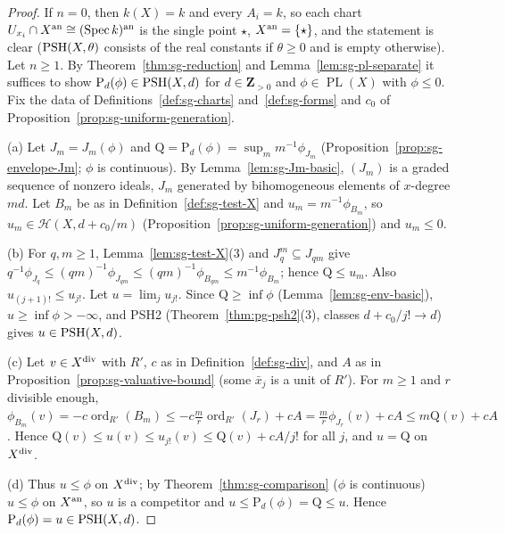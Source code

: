 \begin{proof}
If $n=0$, then $k(X)=k$ and every $A_i=k$, so each chart $U_{x_i}\cap X^{\mathrm{an}}\cong(\operatorname{Spec} k)^{\mathrm{an}}$ is the single point $\star$, $X^{\mathrm{an}}=\{\star\}$,
and the statement is clear ($\operatorname{PSH}(X,\theta)$ consists of the real constants if $\theta\ge0$ and is empty otherwise). Let $n\ge1$. By
Theorem~\ref{thm:sg-reduction} and Lemma~\ref{lem:sg-pl-separate} it suffices to show $\mathrm P_d(\phi)\in\operatorname{PSH}(X,d)$ for $d\in\mathbf{Z}_{>0}$ and
$\phi\in\operatorname{PL}(X)$ with $\phi\le0$. Fix the data of Definitions~\ref{def:sg-charts} and~\ref{def:sg-forms} and $c_0$ of
Proposition~\ref{prop:sg-uniform-generation}.

(a) Let $J_m=J_m(\phi)$ and $\mathrm Q=\mathrm P_d(\phi)=\sup_mm^{-1}\phi_{J_m}$ (Proposition~\ref{prop:sg-envelope-Jm}; $\phi$ is continuous). By
Lemma~\ref{lem:sg-Jm-basic}, $(J_m)$ is a graded sequence of nonzero ideals, $J_m$ generated by bihomogeneous elements of $x$-degree $md$. Let $B_m$ be
as in Definition~\ref{def:sg-test-X} and $u_m=m^{-1}\phi_{B_m}$, so $u_m\in\mathcal H(X,d+c_0/m)$ (Proposition~\ref{prop:sg-uniform-generation}) and $u_m\le0$.

(b) For $q,m\ge1$, Lemma~\ref{lem:sg-test-X}(3) and $J_q^m\subseteq J_{qm}$ give
$q^{-1}\phi_{J_q}\le(qm)^{-1}\phi_{J_{qm}}\le(qm)^{-1}\phi_{B_{qm}}\le m^{-1}\phi_{B_m}$; hence $\mathrm Q\le u_m$. Also $u_{(j+1)!}\le u_{j!}$. Let
$u=\lim_ju_{j!}$. Since $\mathrm Q\ge\inf\phi$ (Lemma~\ref{lem:sg-env-basic}), $u\ge\inf\phi>-\infty$, and PSH2 (Theorem~\ref{thm:pg-psh2}(3), classes
$d+c_0/j!\to d$) gives $u\in\operatorname{PSH}(X,d)$.

(c) Let $v\in X^{\mathrm{div}}$ with $R'$, $c$ as in Definition~\ref{def:sg-div}, and $A$ as in Proposition~\ref{prop:sg-valuative-bound} (some $\bar x_j$ is a unit of $R'$).
For $m\ge1$ and $r$ divisible enough,
$\phi_{B_m}(v)=-c\operatorname{ord}_{R'}(B_m)\le-c\frac mr\operatorname{ord}_{R'}(J_r)+cA=\frac mr\phi_{J_r}(v)+cA\le m\mathrm Q(v)+cA$. Hence
$\mathrm Q(v)\le u(v)\le u_{j!}(v)\le\mathrm Q(v)+cA/j!$ for all $j$, and $u=\mathrm Q$ on $X^{\mathrm{div}}$.

(d) Thus $u\le\phi$ on $X^{\mathrm{div}}$; by Theorem~\ref{thm:sg-comparison} ($\phi$ is continuous) $u\le\phi$ on $X^{\mathrm{an}}$, so $u$ is a competitor and
$u\le\mathrm P_d(\phi)=\mathrm Q\le u$. Hence $\mathrm P_d(\phi)=u\in\operatorname{PSH}(X,d)$.
\end{proof}

